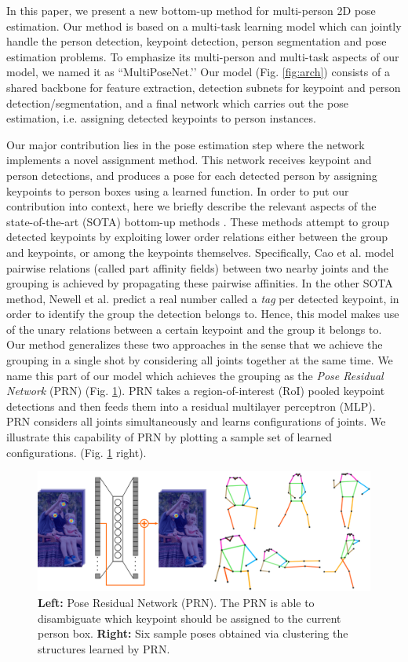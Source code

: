\documentclass[runningheads]{llncs}
\begin{document}
In this paper, we present a new bottom-up method for multi-person 2D pose estimation. Our method is based on a multi-task learning model which can jointly handle the person detection, keypoint detection, person segmentation and pose estimation problems. To emphasize its multi-person and multi-task aspects of our model, we named it as ``MultiPoseNet.’’ Our model (Fig. \ref{fig:arch}) consists of a shared backbone for feature extraction, detection subnets for keypoint and person detection/segmentation, and a final network which carries out the pose estimation, i.e. assigning detected keypoints to person instances. 




Our major contribution lies in the pose estimation step where the network implements a novel assignment method. This network receives keypoint and person detections, and produces a pose for each detected person by assigning keypoints to person boxes using a learned function. In order to put our contribution into context, here we briefly describe the relevant aspects of the state-of-the-art (SOTA) bottom-up methods \cite{Cao2016,Newell2016b}.  These methods attempt to group detected keypoints by exploiting lower order relations either between the group and keypoints, or among the keypoints themselves. Specifically, Cao et al. \cite{Cao2016} model pairwise relations (called part affinity fields) between two nearby joints and the grouping is achieved by propagating these pairwise affinities. In the other SOTA method, Newell et al. \cite{Newell2016b} predict a real number called a \textit{tag} per detected keypoint, in order to identify the group the detection belongs to. Hence, this model makes use of the unary relations between a certain keypoint and the group it belongs to. Our method generalizes these two approaches in the sense that we achieve the grouping in a single shot by considering all joints together at the same time. We name this part of our model which achieves the grouping as the \textit{Pose Residual Network} (PRN) (Fig. \ref{fig:psnatom}). PRN takes a region-of-interest (RoI) pooled keypoint detections and then feeds them into a residual multilayer perceptron (MLP). PRN considers all joints simultaneously and learns configurations of joints. We illustrate this capability of PRN by plotting a sample set of learned configurations. (Fig. \ref{fig:psnatom} right).


\begin{figure}
\centering
\includegraphics[width=.8\textwidth]{Figures/psn_atom.pdf}
\caption{\textbf{Left:} Pose Residual Network (PRN). The PRN is able to disambiguate which keypoint should be assigned to the current person box. \textbf{Right:} Six sample poses obtained via clustering the structures learned by PRN.}
\label{fig:psnatom}
\end{figure}
\end{document}
